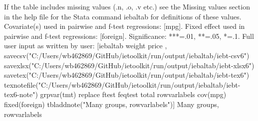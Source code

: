 If the table includes missing values (.n, .o, .v etc.) see the Missing values section in the help file for the Stata command iebaltab for definitions of these values. Covariate(s) used in pairwise and f-test regressions: [mpg]. Fixed effect used in pairwise and f-test regressions: [foreign]. Significance: ***=.01, **=.05, *=.1. Full user input as written by user: [iebaltab weight price , savecsv("C:/Users/wb462869/GitHub/ietoolkit/run/output/iebaltab/iebt-csv6") savexlsx("C:/Users/wb462869/GitHub/ietoolkit/run/output/iebaltab/iebt-xlsx6") savetex("C:/Users/wb462869/GitHub/ietoolkit/run/output/iebaltab/iebt-tex6") texnotefile("C:/Users/wb462869/GitHub/ietoolkit/run/output/iebaltab/iebt-tex6-note") grpvar(tmt) replace ftest feqtest total rowvarlabels cov(mpg) fixed(foreign) tbladdnote("Many groups, rowvarlabels")] Many groups, rowvarlabels
